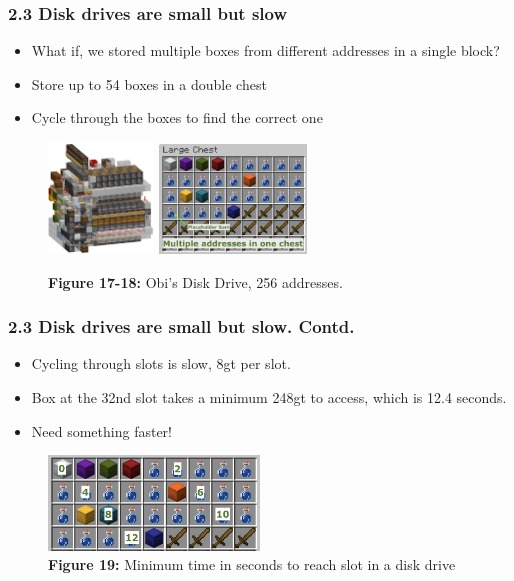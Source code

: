 \documentclass[aspectratio=169]{beamer}
\begin{document}
\begin{frame}
	\frametitle{2.3 Disk drives are small but slow}

    \begin{itemize}
		\item What if, we stored multiple boxes from different addresses in a single block?
		\item Store up to 54 boxes in a double chest
		\item Cycle through the boxes to find the correct one
	\end{itemize}
    \begin{figure}
        \includegraphics[width=0.25\textwidth]{diskdrive.png}
        \includegraphics[width=0.35\textwidth]{diskcontent.png}
        \caption{\textbf{Figure 17-18:} Obi's Disk Drive, 256 addresses.}
    \end{figure}
\end{frame}



\begin{frame}
	\frametitle{2.3 Disk drives are small but slow. Contd.}

    \begin{itemize}
		\item Cycling through slots is slow, 8gt per slot.
		\item Box at the 32nd slot takes a minimum 248gt to access, which is 12.4 seconds.
		\item Need something faster!
	\end{itemize}
    \begin{figure}
        \includegraphics[width=0.5\textwidth]{diskcontent2.png}
        \caption{\textbf{Figure 19:} Minimum time in seconds to reach slot in a disk drive}
    \end{figure}
\end{frame}
\end{document}
